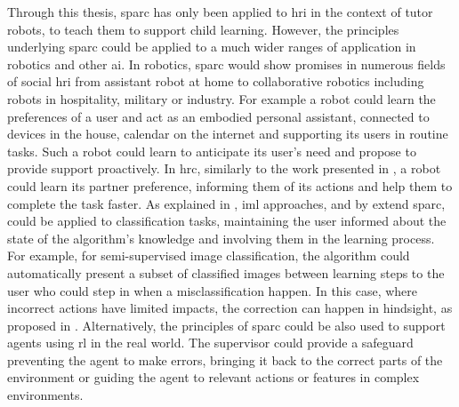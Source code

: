 Through this thesis, \gls{sparc} has only been applied to \gls{hri} in the context of tutor robots, to teach them to support child learning. However, the principles underlying \gls{sparc} could be applied to a much wider ranges of application in robotics and other \gls{ai}. In robotics, \gls{sparc} would show promises in numerous fields of social \gls{hri} from assistant robot at home to collaborative robotics including robots in hospitality, military or industry. For example a robot could learn the preferences of a user and act as an embodied personal assistant, connected to devices in the house, calendar on the internet and supporting its users in routine tasks. Such a robot could learn to anticipate its user's need and propose to provide support proactively. In \gls{hrc}, similarly to the work presented in \cite{munzer2017efficient}, a robot could learn its partner preference, informing them of its actions and help them to complete the task faster. As explained in \cite{feil2005defining}, \gls{iml} approaches, and by extend \gls{sparc}, could be applied to classification tasks, maintaining the user informed about the state of the algorithm's knowledge and involving them in the learning process. For example, for semi-supervised image classification, the algorithm could automatically present a subset of classified images between learning steps to the user who could step in when a misclassification happen. In this case, where incorrect actions have limited impacts, the correction can happen in hindsight, as proposed in \cite{chernova2009interactive}. Alternatively, the principles of \gls{sparc} could be also used to support agents using \gls{rl} in the real world. The supervisor could provide a safeguard preventing the agent to make errors, bringing it back to the correct parts of the environment or guiding the agent to relevant actions or features in complex environments.


